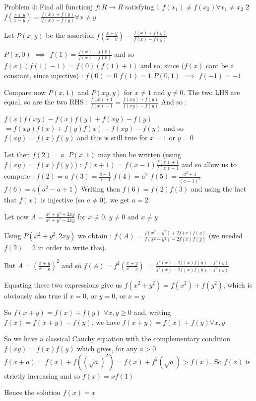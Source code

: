 \begin{solution}
	\begin{tcolorbox}Problem 4:
Find all functionj $ f: R \rightarrow R$ satisfying
1\/ $ f(x_1) \neq f(x_2) \forall x_1 \neq x_2$
2\/ $ f(\frac {x + y}{x - y}) = \frac {f(x) + f(y)}{f(x) - f(y)} \forall x \neq y$\end{tcolorbox}
Let $ P(x,y)$ be the assertion $ f(\frac{x+y}{x-y})=\frac{f(x)+f(y)}{f(x)-f(y)}$

$ P(x,0)$ $ \implies$ $ f(1)=\frac{f(x)+f(0)}{f(x)-f(0)}$ and so $ f(x)(f(1)-1)=f(0)(f(1)+1)$ and so, since $ (f(x)$ cant be a constant, since injective) :
$ f(0)=0$
$ f(1)=1$
$ P(0,1)$ $ \implies$ $ f(-1)=-1$

Compare now $ P(x,1)$ and $ P(xy,y)$ for $ x\neq 1$ and $ y\neq 0$. The two LHS are equal, so are the two RHS : $ \frac{f(x)+1}{f(x)-1}=\frac{f(xy)+f(y)}{f(xy)-f(y)}$ And so :

$ f(x)f(xy)-f(x)f(y)+f(xy)-f(y)$ $ =f(xy)f(x)+f(y)f(x)-f(xy)-f(y)$ and so $ \boxed{f(xy)=f(x)f(y)}$  and this is still true for $ x=1$ or $ y=0$

Let then $ f(2)=a$. $ P(x,1)$ may then be written (using $ f(xy)=f(x)f(y)$) : $ f(x+1)=f(x-1)\frac{f(x)+1}{f(x)-1}$ and so allow us to compute :
$ f(2)=a$
$ f(3)=\frac{a+1}{a-1}$
$ f(4)=a^2$
$ f(5)=\frac{a^2+1}{(a-1)^2}$
$ f(6)=a(a^2-a+1)$
Writing then $ f(6)=f(2)f(3)$ and using the fact that $ f(x)$ is injective (so $ a\neq 0$), we get $ a=2$.

Let now $ A=\frac{x^2+y^2+2xy}{x^2+y^2-2xy}$ for $ x\neq 0$, $ y\neq 0$ and $ x\neq y$

Using $ P(x^2+y^2,2xy)$ we obtain : $ f(A)=\frac{f(x^2+y^2)+2f(x)f(y)}{f(x^2+y^2)-2f(x)f(y)}$ (we needed $ f(2)=2$ in order to write this).

But $ A=(\frac{x+y}{x-y})^2$ and so $ f(A)=f^2(\frac{x+y}{x-y})$ $ =\frac{f^2(x)+2f(x)f(y)+f^2(y)}{f^2(x)-2f(x)f(y)+f^2(y)}$

Equating these two expressions give us $ f(x^2+y^2)=f(x^2)+f(y^2)$, which is obviously also true if $ x=0$, or $ y=0$, or $ x=y$

So $ f(x+y)=f(x)+f(y)$ $ \forall x,y\geq 0$ and, writing $ f(x)=f(x+y)-f(y)$, we have $ \boxed{f(x+y)=f(x)+f(y)\forall x,y}$

So we have a classical Cauchy equation with the complementary condition $ f(xy)=f(x)f(y)$ which gives, for any $ a>0$ $ f(x+a)=f(x)+f((\sqrt a)^2)=f(x)+f^2(\sqrt a)>f(x)$. So $ f(x)$ is strictly increasing and so $ f(x)=xf(1)$

Hence the solution $ f(x)=x$
\end{solution}



